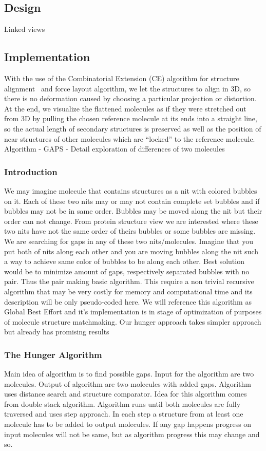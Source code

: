 \documentclass[twocolumn]{bmcart}%
\begin{document}
\subsection*{Design}
Linked views


\subsection*{Implementation}
With the use of the Combinatorial Extension (CE) algorithm for structure alignment~\cite{Shindyalov1998} and force layout algorithm, we let the structures to align in 3D, so there is no deformation caused by choosing a particular projection or distortion. 
At the end, we visualize the flattened molecules as if they were stretched out from 3D by pulling the chosen reference molecule at its ends into a straight line, so the actual length of secondary structures is preserved as well as the position of near structures of other molecules which are “locked” to the reference molecule.
Algorithm - GAPS - Detail exploration of differences of two molecules

\subsubsection{Introduction}
We may imagine molecule that contains structures as a nit with colored bubbles on it. 
Each of these two nits may or may not contain complete set bubbles and if bubbles may not be in same order. 
Bubbles may be moved along the nit but their order can not change. 
From protein structure view we are interested where these two nits have not the same order of theirs bubbles or some bubbles are missing. 
We are searching for gaps in any of these two nits/molecules. 
Imagine that you put both of nits along each other and you are moving bubbles along the nit such a way to achieve same color of bubbles to be along each other. 
Best solution would be to minimize amount of gaps, respectively separated bubbles with no pair. 
Thus the pair making basic algorithm. 
This require a non trivial recursive algorithm that may be very costly for memory and computational time and its description will be only pseudo-coded here. 
We will reference this algorithm as Global Best Effort and it's implementation is in stage of optimization of purposes of molecule structure matchmaking. 
Our hunger approach takes simpler approach but already has promising results

\subsubsection{The Hunger Algorithm}
Main idea of algorithm is to find possible gaps. 
Input for the algorithm are two molecules. Output of algorithm are two molecules with added gaps. 
Algorithm uses distance search and structure comparator. 
Idea for this algorithm comes from double stack algorithm.
Algorithm runs until both molecules are fully traversed and uses step approach. 
In each step a structure from at least one molecule has to be added to output molecules. 
If any gap happens progress on input molecules will not be same, but as algorithm progress this may change and so.
\end{document}
